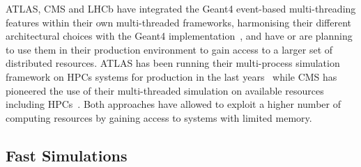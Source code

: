 \documentclass[11pt,a4paper]{article}
\begin{document}
ATLAS, CMS and LHCb have integrated the Geant4 event-based
multi-threading features within their own multi-threaded frameworks,
harmonising their different architectural choices with the Geant4
implementation~\cite{CMS02, LHCb01, ATLAS01}, and have or are planning to
use them in their production environment to gain access to a larger set
of distributed resources. ATLAS has been running their multi-process
simulation framework on HPCs systems for production in the
last years~\cite{ATLAS02, Benjamin:2696330} 
while CMS has pioneered the use of their multi-threaded
simulation on available resources including HPCs~\cite{CMS03}. Both
approaches have allowed to exploit a higher number of computing
resources by gaining access to systems with limited memory.

\hypertarget{fast-simulations}{%
\subsection{Fast Simulations}\label{fast-simulations}}
\end{document}
